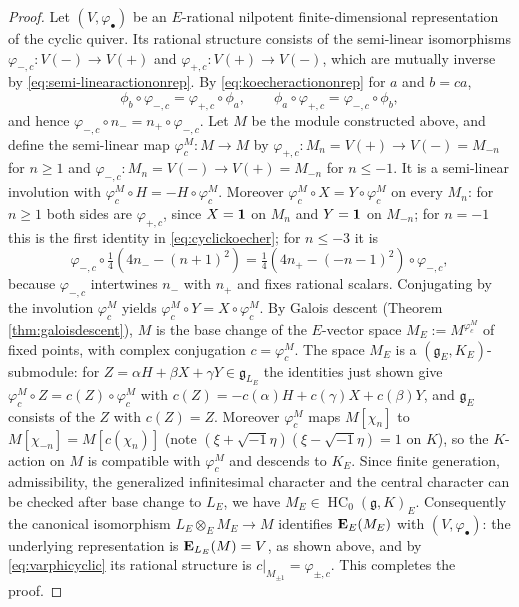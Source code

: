 \documentclass[a4paper,12pt,reqno]{amsart}
\newcommand{\EE}{{\rm\bf E}}
\DeclareMathOperator{\HC}{\mathrm{HC}}
\theoremstyle{plain}
\theoremstyle{remark}
\begin{document}
\begin{proof}
    \smallskip
    \noindent{\bf Essential surjectivity of $\EE_E$.}
    Let $(V,\varphi_\bullet)$ be an $E$-rational nilpotent finite-dimensional representation of the cyclic quiver. Its rational structure consists of the semi-linear isomorphisms $\varphi_{-,c}\colon V(-)\to V(+)$ and $\varphi_{+,c}\colon V(+)\to V(-)$, which are mutually inverse by \eqref{eq:semi-linearactiononrep}. By \eqref{eq:koecheractiononrep} for $a$ and $b=ca$,
    \begin{equation}
      \phi_b\circ\varphi_{-,c}=\varphi_{+,c}\circ\phi_a,\qquad
      \phi_a\circ\varphi_{+,c}=\varphi_{-,c}\circ\phi_b,
      \label{eq:cyclickoecher}
    \end{equation}
    and hence $\varphi_{-,c}\circ n_-=n_+\circ\varphi_{-,c}$. Let $M$ be the module constructed above, and define the semi-linear map $\varphi_c^M\colon M\to M$ by $\varphi_{+,c}\colon M_n=V(+)\to V(-)=M_{-n}$ for $n\geq1$ and $\varphi_{-,c}\colon M_n=V(-)\to V(+)=M_{-n}$ for $n\leq-1$. It is a semi-linear involution with $\varphi_c^M\circ H=-H\circ\varphi_c^M$. Moreover $\varphi_c^M\circ X=Y\circ\varphi_c^M$ on every $M_n$: for $n\geq1$ both sides are $\varphi_{+,c}$, since $X={\bf1}$ on $M_n$ and $Y={\bf1}$ on $M_{-n}$; for $n=-1$ this is the first identity in \eqref{eq:cyclickoecher}; for $n\leq-3$ it is
    \[
      \varphi_{-,c}\circ\tfrac14\left(4n_--(n+1)^2\right)=\tfrac14\left(4n_+-(-n-1)^2\right)\circ\varphi_{-,c},
    \]
    because $\varphi_{-,c}$ intertwines $n_-$ with $n_+$ and fixes rational scalars. Conjugating by the involution $\varphi_c^M$ yields $\varphi_c^M\circ Y=X\circ\varphi_c^M$. By Galois descent (Theorem \ref{thm:galoisdescent}), $M$ is the base change of the $E$-vector space $M_E:=M^{\varphi_c^M}$ of fixed points, with complex conjugation $c=\varphi_c^M$. The space $M_E$ is a $(\mathfrak{g}_E,K_E)$-submodule: for $Z=\alpha H+\beta X+\gamma Y\in\mathfrak{g}_{L_E}$ the identities just shown give $\varphi_c^M\circ Z=c(Z)\circ\varphi_c^M$ with $c(Z)=-c(\alpha)H+c(\gamma)X+c(\beta)Y$, and $\mathfrak{g}_E$ consists of the $Z$ with $c(Z)=Z$. Moreover $\varphi_c^M$ maps $M[\chi_n]$ to $M[\chi_{-n}]=M[c(\chi_n)]$ (note $(\xi+\sqrt{-1}\eta)(\xi-\sqrt{-1}\eta)=1$ on $K$), so the $K$-action on $M$ is compatible with $\varphi_c^M$ and descends to $K_E$. Since finite generation, admissibility, the generalized infinitesimal character and the central character can be checked after base change to $L_E$, we have $M_E\in\HC_0(\mathfrak{g},K)_E$. Consequently the canonical isomorphism $L_E\otimes_E M_E\to M$ identifies $\EE_E(M_E)$ with $(V,\varphi_\bullet)$: the underlying representation is $\EE_{L_E}(M)=V$, as shown above, and by \eqref{eq:varphicyclic} its rational structure is $c|_{M_{\pm1}}=\varphi_{\pm,c}$. This completes the proof.
    \end{proof}
\end{document}
